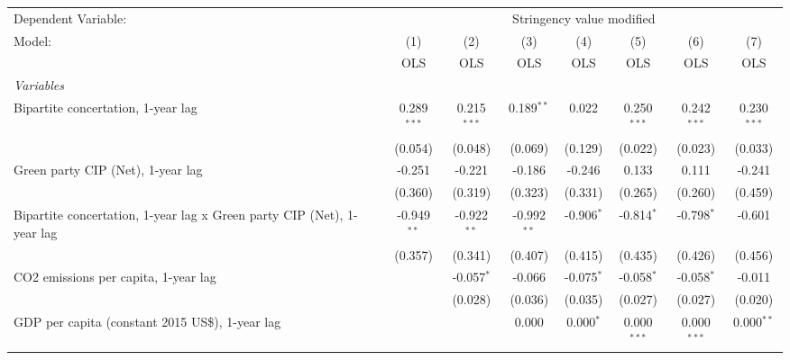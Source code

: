 
\begingroup
\centering
\begin{tabular}{lccccccc}
   \toprule
   Dependent Variable: & \multicolumn{7}{c}{Stringency value modified}\\
   Model:                                                                 & (1)           & (2)           & (3)           & (4)          & (5)           & (6)           & (7)\\  
                                                                          &  OLS          & OLS           & OLS           & OLS          & OLS           & OLS           & OLS\\  
   \midrule
   \emph{Variables}\\
   Bipartite concertation, 1-year lag                                     & 0.289$^{***}$ & 0.215$^{***}$ & 0.189$^{**}$  & 0.022        & 0.250$^{***}$ & 0.242$^{***}$ & 0.230$^{***}$\\   
                                                                          & (0.054)       & (0.048)       & (0.069)       & (0.129)      & (0.022)       & (0.023)       & (0.033)\\   
   Green party CIP (Net), 1-year lag                                      & -0.251        & -0.221        & -0.186        & -0.246       & 0.133         & 0.111         & -0.241\\   
                                                                          & (0.360)       & (0.319)       & (0.323)       & (0.331)      & (0.265)       & (0.260)       & (0.459)\\   
   Bipartite concertation, 1-year lag x Green party CIP (Net), 1-year lag & -0.949$^{**}$ & -0.922$^{**}$ & -0.992$^{**}$ & -0.906$^{*}$ & -0.814$^{*}$  & -0.798$^{*}$  & -0.601\\   
                                                                          & (0.357)       & (0.341)       & (0.407)       & (0.415)      & (0.435)       & (0.426)       & (0.456)\\   
   CO2 emissions per capita, 1-year lag                                   &               & -0.057$^{*}$  & -0.066        & -0.075$^{*}$ & -0.058$^{*}$  & -0.058$^{*}$  & -0.011\\   
                                                                          &               & (0.028)       & (0.036)       & (0.035)      & (0.027)       & (0.027)       & (0.020)\\   
   GDP per capita (constant 2015 US\$), 1-year lag                        &               &               & 0.000         & 0.000$^{*}$  & 0.000$^{***}$ & 0.000$^{***}$ & 0.000$^{**}$\\   

\end{tabular}
